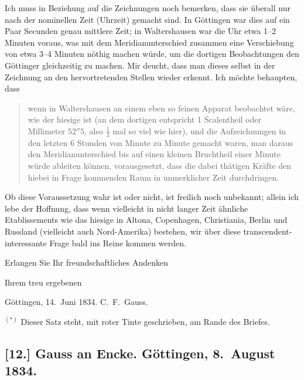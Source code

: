 \documentclass[12pt,a4paper]{article}
\begin{document}
Ich muss in Beziehung auf die Zeichnungen noch bemerken, dass sie \"uberall nur nach der nominellen Zeit (Uhrzeit) gemacht sind. In G\"ottingen war dies auf ein Paar Secunden genau mittlere Zeit; in Waltershausen war die Uhr etwa 1--2 Minuten voraus, was mit dem Meridianunterschied zusammen eine Verschiebung von etwa 3--4 Minuten n\"othig machen w\"urde, um die dortigen Beobachtungen den G\"ottinger gleichzeitig zu machen. Mir deucht, dass man dieses selbst in der Zeichnung an den hervortretenden Stellen wieder erkennt. Ich m\"ochte behaupten, dass
\begin{quote}
wenn in Waltershausen an einem eben so feinen Apparat beobachtet w\"are, wie der hiesige ist (an dem dortigen entspricht 1 Scalentheil oder Millimeter $52''5$, also $\frac13$ mal so viel wie hier), und die Aufzeichnungen in den letzten 6 Stunden von Minute zu Minute gemacht waren, man daraus den Meridianunterschied bis auf einen kleinen Bruchtheil einer Minute w\"urde ableiten k\"onnen, vorausgesetzt, dass die dabei th\"atigen Kr\"afte den hiebei in Frage kommenden Raum in unmerklicher Zeit durchdringen.
\end{quote}

Ob diese Voraussetzung wahr ist oder nicht, ist freilich noch unbekannt; allein ich lebe der Hoffnung, dass wenn vielleicht in nicht langer Zeit \"ahnliche Etablissements wie das hiesige in Altona, Copenhagen, Christiania, Berlin und Russland (vielleicht auch Nord-Amerika) bestehen, wir \"uber diese transcendent-interessante Frage bald ins Reine kommen werden.

\begin{flushright}
Erlangen Sie Ihr freundschaftliches Andenken

Ihrem treu ergebenen

G\"ottingen, 14.~Juni 1834. \quad C.~F.~Gauss.
\end{flushright}

\medskip\noindent
$^{(*)}$ Dieser Satz steht, mit roter Tinte geschrieben, am Rande des Briefes.


\subsection*{[12.] Gauss an Encke. G\"ottingen, 8.~August 1834.}
\end{document}
